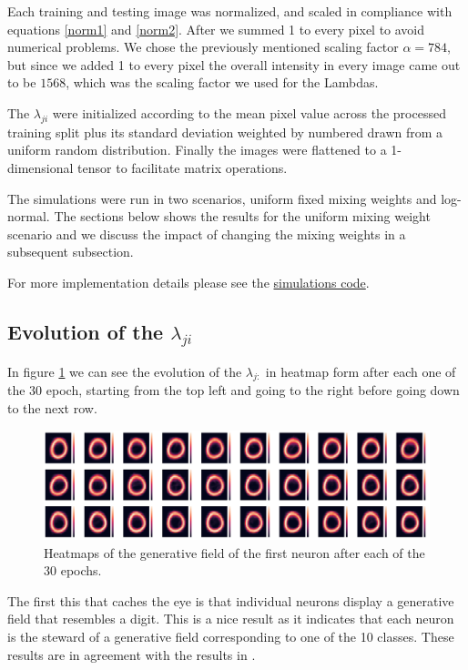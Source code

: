 \documentclass{article}
\begin{document}
Each training and testing image was normalized, and scaled in compliance with equations \eqref{norm1} and \eqref{norm2}. After we summed 1 to every pixel to avoid numerical problems. We chose the previously mentioned scaling factor $\alpha = 784$, but since we added 1 to every pixel the overall intensity in every image came out to be $1568$, which was the scaling factor we used for the Lambdas.  

The \(\lambda_{ji}\) were initialized according to the mean pixel value across the processed training split plus its standard deviation weighted by numbered drawn from a uniform random distribution. Finally the images were flattened to a 1-dimensional tensor to facilitate matrix operations. 

The simulations were run in two scenarios, uniform fixed mixing weights and log-normal. The sections below shows the results for the uniform mixing weight scenario and we discuss the impact of changing the mixing weights in a subsequent subsection. 

For more implementation details please see the \href{https://github.com/Sann5/neural_populations}{\color{draculacyan} simulations code}.

\subsection{Evolution of the $\lambda_{ji}$}
In figure \ref{gen_filed_evo} we can see the evolution of the \(\lambda_{j:}\) in heatmap form after each one of the 30 epoch, starting from the top left and going to the right before going down to the next row. 

\begin{figure}[h]
    \includegraphics[width=\textwidth]{img/output_41_1.png}
    \caption{Heatmaps of the generative field of the first neuron after each of the 30 epochs. \label{gen_filed_evo}}
\end{figure}

The first this that caches the eye is that individual neurons display a generative field that resembles a digit. This is a nice result as it indicates that each neuron is the steward of a generative field corresponding to one of the 10 classes. These results are in agreement with the results in \cite{Keck2012}.
\end{document}
